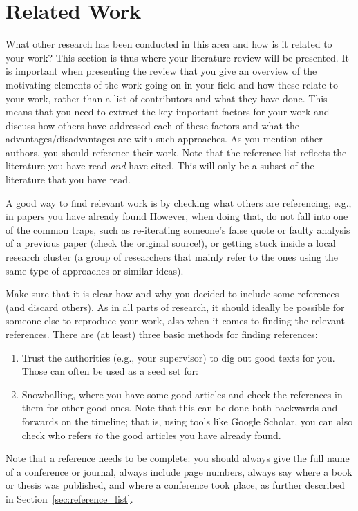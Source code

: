 \chapter{Related Work}
\label{cha:related_work}

What other research has been conducted in this area and how is it related to your work?
This section is thus where your literature review will be presented. It is important when presenting the review
that you give an overview of the motivating elements of the work going on in your field and how these relate to your work,
rather than a list of contributors and what they have done.
This means that you need to extract the key important factors for your work and discuss how others have addressed
each of these factors and what the advantages/disadvantages are with such approaches.
As you mention other authors, you should reference their work.
Note that the reference list reflects the literature you have read {\em and\/} have cited.
This will only be a subset of the literature that you have read.

A good way to find relevant work is by checking what others are referencing, e.g., in papers you have already found
However, when doing that,
do not fall into one of the common traps, such as re-iterating someone's false quote or faulty analysis of
a previous paper (check the original source!), or getting stuck inside a local research cluster (a group of
researchers that mainly refer to the ones using the same type of approaches or similar ideas).

Make sure that it is clear how and why you decided to include some references (and discard others). As in all parts of research, it should ideally be possible for someone else to reproduce your work, also when it comes to finding the relevant references.
There are (at least) three basic methods for finding references:
\begin{enumerate}
    \item Trust the authorities (e.g., your supervisor) to dig out good texts for you.
          Those can often be used as a seed set for:
    \item Snowballing, where you have some good articles and check the references in them for other good ones.
          Note that this can be done both backwards and forwards on the timeline; that is, using tools like Google Scholar, you can also check who refers \textit{to\/} the good articles you have already found.
\end{enumerate}

Note that a reference needs to be complete: you should always give the full name of a conference or journal,
always include page numbers, always say where a book or thesis was published, and where a conference took place, as further described in Section~\ref{sec:reference_list}.

\glsresetall